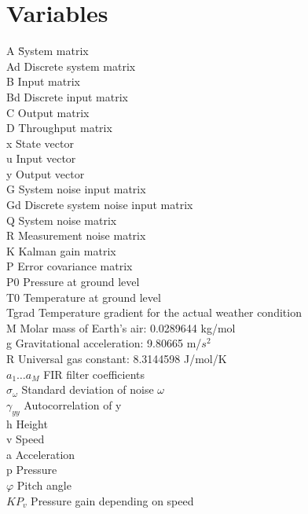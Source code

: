 \documentclass[a4paper, english, 10pt]{report}
\begin{document}
\section*{Variables}
\begin{tabbing}
 A \hspace{5.55cm}	\= System matrix \\
 Ad 		\> Discrete system matrix \\
 B 		\> Input matrix \\
 Bd 		\> Discrete input matrix \\
 C 		\> Output matrix \\
 D 		\> Throughput matrix \\
 x		\> State vector \\
 u		\> Input vector \\
 y		\> Output vector \\
 G 		\> System noise input matrix \\
 Gd 		\> Discrete system noise input matrix \\
 Q 		\> System noise matrix \\
 R 		\> Measurement noise matrix \\
 K 		\> Kalman gain matrix \\
 P 		\> Error covariance matrix \\ 
 P0 		\> Pressure at ground level \\
 T0 		\> Temperature at ground level \\
 Tgrad 		\> Temperature gradient for the actual weather condition \\
 M 		\> Molar mass of Earth's air: 0.0289644 kg/mol\\
 g 		\> Gravitational acceleration: 9.80665 m/$s^2$\\
 R 		\> Universal gas constant: 8.3144598 J/mol/K\\
 $a_1 \hdots a_M$ \> FIR filter coefficients  \\
 $\sigma_{\omega}$ \> Standard deviation of noise $\omega$ \\
 $\gamma_{yy} $ \> Autocorrelation of y \\
 h		\> Height \\
 v 		\> Speed \\
 a 	 	\> Acceleration \\
 p		\> Pressure \\
 $\varphi$	\> Pitch angle \\
 $KP_v$		\> Pressure gain depending on speed
\end{tabbing}
\end{document}
